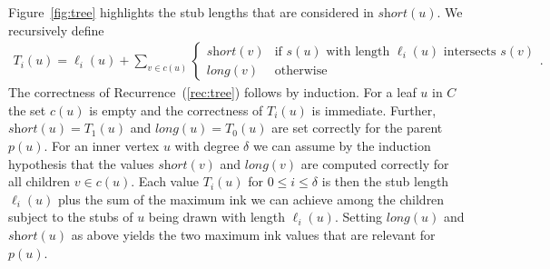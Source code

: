 \documentclass[a4paper,english,numberwithinsect]{eurocg18}
\newcommand{\maxsped}{\ensuremath{\textsc{MaxSPED}}\xspace}
\newcommand{\sollong}{\ensuremath{\textit{long}}\xspace}
\newcommand{\solshort}{\ensuremath{\textit{short}}\xspace}
\begin{document}
Figure~\ref{fig:tree} highlights the stub lengths that are considered in $\solshort(u)$. We recursively define %
\begin{align}
	\label{rec:tree}
	T_i(u) = \ell_i(u) + \sum_{v \in c(u)}
	\begin{cases}
		\solshort(v) & \text{if } s(u) \text{ with length } \ell_i(u) \text{ intersects } s(v) \\
		\sollong(v) & \text{otherwise}
	\end{cases}.
\end{align}
The correctness of Recurrence~(\ref{rec:tree}) follows by induction. 
For a leaf $u$ in $C$ the set $c(u)$ is empty and the correctness of $T_i(u)$ is immediate.
Further, $\solshort(u) = T_1(u)$ and $\sollong(u) = T_0(u)$ are set correctly for the parent $p(u)$.
For an inner vertex $ u $ with degree $\delta$ we can assume by the induction hypothesis that the values $ \solshort(v) $ and $ \sollong(v) $ are computed correctly for all children $ v \in c(u) $. 
Each value $ T_i(u) $ for $ 0 \leq i \leq \delta $ is then the stub length $ \ell_i(u) $ plus the sum of the maximum ink we can achieve among the children subject to the stubs of $u$ being drawn with length $\ell_i(u)$. 
Setting $ \sollong(u) $ and $ \solshort(u) $ as above yields the two maximum ink values that are relevant for $ p(u) $.
\end{document}
